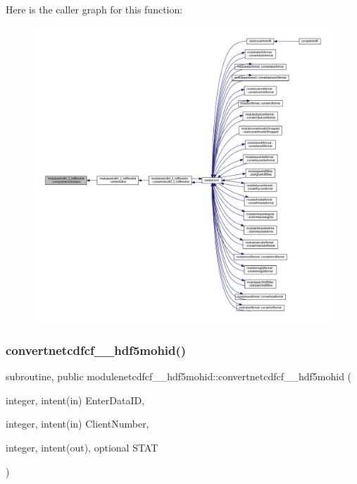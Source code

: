 Here is the caller graph for this function\+:\nopagebreak
\begin{figure}[H]
\begin{center}
\leavevmode
\includegraphics[width=350pt]{namespacemodulenetcdfcf__2__hdf5mohid_a849aa8add58ebd9a4fc70960b4af25fa_icgraph}
\end{center}
\end{figure}
\mbox{\label{namespacemodulenetcdfcf__2__hdf5mohid_ad44cbe3d10b2660f418505ecaee704cc}} 
\subsubsection{\texorpdfstring{convertnetcdfcf\+\_\+\_\+hdf5mohid()}{convertnetcdfcf\_2\_hdf5mohid()}}
{\footnotesize\ttfamily subroutine, public modulenetcdfcf\+\_\+\_\+hdf5mohid\+::convertnetcdfcf\+\_\+\_\+hdf5mohid (\begin{DoxyParamCaption}\item[{integer, intent(in)}]{Enter\+Data\+ID,  }\item[{integer, intent(in)}]{Client\+Number,  }\item[{integer, intent(out), optional}]{S\+T\+AT }\end{DoxyParamCaption})}

